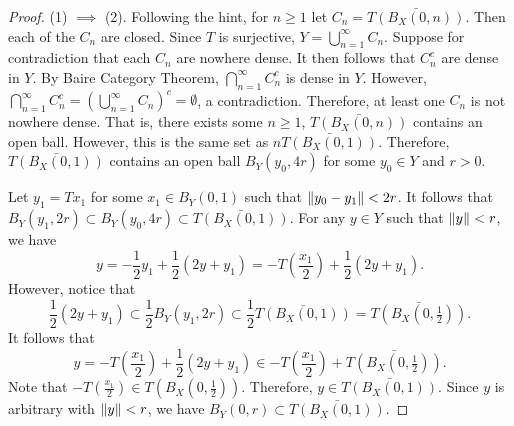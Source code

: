 \documentclass[a4paper]{article}
\begin{document}
\begin{proof}
  (1) $\implies$ (2). Following the hint, for $n \geq 1$ let 
  $C_n = \bar{T(B_X(0, n))}$. Then each of the $C_n$ are closed.
  Since $T$ is surjective, $Y = \bigcup_{n=1}^\infty C_n$. 
  Suppose for contradiction that each $C_n$ are nowhere dense.
  It then follows that $C_n^c$ are dense in $Y$. By Baire Category
  Theorem, $\bigcap_{n=1}^\infty C_n^c$ is dense in $Y$. However,
  $\bigcap_{n=1}^\infty C_n^c = \left( \bigcup_{n=1}^\infty C_n \right)^c 
  = \emptyset$, a contradiction. Therefore, at least one $C_n$
  is not nowhere dense. That is, there exists some $n \geq 1$, 
  $\bar{T(B_X(0, n))}$ contains an open ball. However, 
  this is the same set as $n \bar{T(B_X(0, 1))}$. Therefore, 
  $\bar{T(B_X(0, 1))}$ contains an open ball $B_Y(y_0, 4 r)$
  for some $y_0 \in Y$ and $r > 0$.

  Let $y_1 = T x_1$ for some $x_1 \in B_Y(0,1)$ such that 
  $\left\lVert y_0 - y_1\right\rVert < 2 r$. It follows that 
  $B_Y(y_1, 2 r) \subset B_Y(y_0, 4 r) \subset \bar{T(B_X(0,1))}$. 
  For any $y \in Y$ such that 
  $\left\lVert y\right\rVert < r$, we have 
  \[
  y = -\frac{1}{2} y_1 + \frac{1}{2} (2 y + y_1) = 
  - T \left( \frac{x_1}{2} \right) + \frac{1}{2} (2 y + y_1).
  \]
  However, notice that 
  \[
  \frac{1}{2} (2 y + y_1) \subset \frac{1}{2} B_Y(y_1, 2r) 
  \subset \frac{1}{2} \bar{T(B_X(0, 1))} 
  = \bar{T(B_X(0, \tfrac{1}{2}))} .
  \]
  It follows that 
  \[
  y = - T \left( \frac{x_1}{2} \right) + \frac{1}{2} (2 y + y_1)
  \in - T \left( \frac{x_1}{2} \right) + \bar{T(B_X(0, \tfrac{1}{2}))}.
  \]
  Note that $- T(\frac{x_1}{2}) \in T(B_X(0, \frac{1}{2}))$. Therefore, 
  $y \in \bar{T(B_X(0, 1))}$. Since $y$ is arbitrary with 
  $\left\lVert y\right\rVert < r$, we have $B_Y(0, r) \subset \bar{T(B_X(0,1))}$.


\end{proof}
\end{document}
